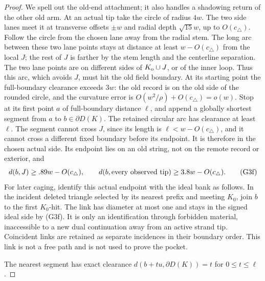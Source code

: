 \begin{proof}
We spell out the old-end attachment; it also handles a shadowing return
of the other old arm.  At an actual tip take the circle of radius \(4w\).
The two side lanes meet it at transverse offsets \(\pm w\) and radial
depth \(\sqrt{15}w\), up to \(O(c_\triangle)\).  Follow the circle from
the chosen lane away from the radial stem.  The long arc between these
two lane points stays at distance at least \(w-O(c_\triangle)\) from
the local \(J\); the rest of \(J\) is farther by the stem length and
the centerline separation.  The two lane points are on different sides
of \(K_{\rm o}\cup J\), or of the inner loop.  Thus this arc, which
avoids \(J\), must hit the old field boundary.  At its starting point
the full-boundary clearance exceeds \(3w\): the old record is on the
old side of the rounded circle, and the curvature error is
\(O(w^2/\rho)+O(c_\triangle)=o(w)\).  Stop at its first point \(a\)
of full-boundary distance \(\ell\), and append a globally shortest
segment from \(a\) to \(b\in\partial D(K)\).  The retained circular
arc has clearance at least \(\ell\).  The segment cannot cross \(J\),
since its length is \(\ell<w-O(c_\triangle)\), and it cannot cross a
different fixed boundary before its endpoint.  It is therefore in the
chosen actual side.  Its endpoint lies on an old string, not on the
remote record or exterior, and
\[
 d(b,J)\ge .89w-O(c_\triangle),\qquad
 d(b,\hbox{every observed tip})\ge3.8w-O(c_\triangle).       \tag{G3f}
\]
For later caging, identify this actual endpoint with the ideal bank as
follows.  In the incident deleted triangle selected by its nearest prefix
and meeting \(K_0\), join \(b\) to the first \(K_0\)-hit.  The link has
diameter at most one and stays in the signed ideal side by (G3f).  It is
only an identification through forbidden material, inaccessible to a new
dual continuation away from an active strand tip.  Coincident links are retained as
separate incidences in their boundary order.  This link is not a free path
and is not used to prove the pocket.

The nearest segment has exact clearance
\(d(b+tu,\partial D(K))=t\) for \(0\le t\le\ell\).


\end{proof}

